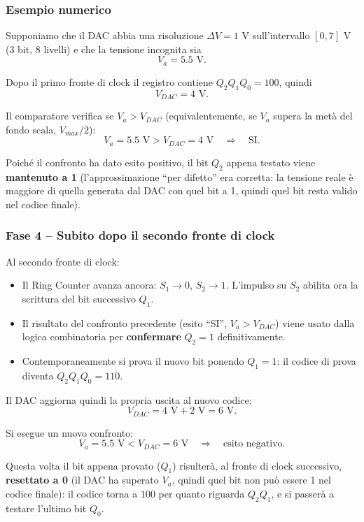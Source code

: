 \documentclass[11pt,a4paper]{report}
\begin{document}
\bigskip
\subsubsection{Esempio numerico}

Supponiamo che il DAC abbia una risoluzione $\Delta V = 1\text{ V}$ sull'intervallo $[0,7]\text{ V}$ (3 bit, 8 livelli) e che la tensione incognita sia
\[
V_a = 5.5\text{ V}.
\]

Dopo il primo fronte di clock il registro contiene $Q_2Q_1Q_0=100$, quindi
\[
V_{DAC} = 4\text{ V}.
\]

Il comparatore verifica se $V_a > V_{DAC}$ (equivalentemente, se $V_a$ supera la metà del fondo scala, $V_{max}/2$):
\[
V_a = 5.5\text{ V} > V_{DAC}=4\text{ V} \quad\Longrightarrow\quad \text{SI}.
\]

Poich\'e il confronto ha dato esito positivo, il bit $Q_2$ appena testato viene \textbf{mantenuto a 1} (l'approssimazione ``per difetto'' era corretta: la tensione reale è maggiore di quella generata dal DAC con quel bit a 1, quindi quel bit resta valido nel codice finale).

\bigskip
\subsubsection{Fase 4 -- Subito dopo il secondo fronte di clock}

Al secondo fronte di clock:

\begin{itemize}
    \item Il Ring Counter avanza ancora: $S_1\to 0$, $S_2\to 1$. L'impulso su $S_2$ abilita ora la scrittura del bit successivo $Q_1$.
    \item Il risultato del confronto precedente (esito ``SI'', $V_a>V_{DAC}$) viene usato dalla logica combinatoria per \textbf{confermare} $Q_2=1$ definitivamente.
    \item Contemporaneamente si prova il nuovo bit ponendo $Q_1=1$: il codice di prova diventa $Q_2Q_1Q_0 = 110$.
\end{itemize}

Il DAC aggiorna quindi la propria uscita al nuovo codice:
\[
V_{DAC} = 4\text{ V} + 2\text{ V} = 6\text{ V}.
\]

Si esegue un nuovo confronto:
\[
V_a = 5.5\text{ V} < V_{DAC} = 6\text{ V} \quad\Longrightarrow\quad \text{esito negativo}.
\]

Questa volta il bit appena provato ($Q_1$) risulter\`a, al fronte di clock successivo, \textbf{resettato a 0} (il DAC ha superato $V_a$, quindi quel bit non pu\`o essere 1 nel codice finale): il codice torna a $100$ per quanto riguarda $Q_2Q_1$, e si passer\`a a testare l'ultimo bit $Q_0$.
\end{document}
